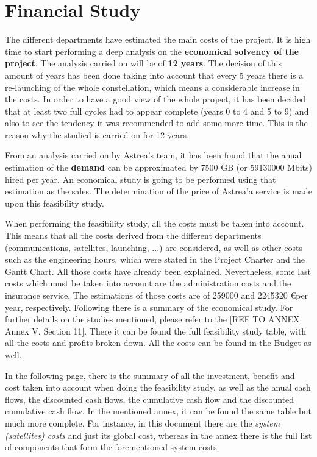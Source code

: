 \chapter{Financial Study}

The different departments have estimated the main costs of the project. It is high time to start performing a deep analysis on the \textbf{economical solvency of the project}. The analysis carried on will be of \textbf{12 years}. The decision of this amount of years has been done taking into account that every 5 years there is a re-launching of the whole constellation, which means a considerable increase in the costs. In order to have a good view of the whole project, it has been decided that at least two full cycles had to appear complete (years 0 to 4 and 5 to 9) and also to see the tendency it was recommended to add some more time. This is the reason why the studied is carried on for 12 years.

From an analysis carried on by Astrea's team, it has been found that the anual estimation of the \textbf{demand} can be approximated by 7500 GB (or 59130000 Mbits) hired per year. An economical study is going to be performed using that estimation as the sales. The determination of the price of Astrea'a service is made upon this feasibility study. 

When performing the feasibility study, all the costs must be taken into account. This means that all the costs derived from the different departments (communications, satellites, launching, ...) are considered, as well as other costs such as the engineering hours, which were stated in the Project Charter and the Gantt Chart. All those costs have already been explained. Nevertheless, some last costs which must be taken into account are the administration costs and the insurance service. The estimations of those costs are of 259000 and 2245320 \euro  per year, respectively. Following there is a summary of the economical study. For further details on the studies mentioned, please refer to the [{REF TO ANNEX: Annex V. Section 11}]. There it can be found the full feasibility study table, with all the costs and profits broken down. All the costs can be found in the Budget as well.

In the following page, there is the summary of all the investment, benefit and cost taken into account when doing the feasibility study, as well as the anual cash flows, the discounted cash flows, the cumulative cash flow and the discounted cumulative cash flow. In the mentioned annex, it can be found the same table but much more complete. For instance, in this document there are the \textit{system (satellites) costs} and just its global cost, whereas in the annex there is the full list of components that form the forementioned system costs. 

